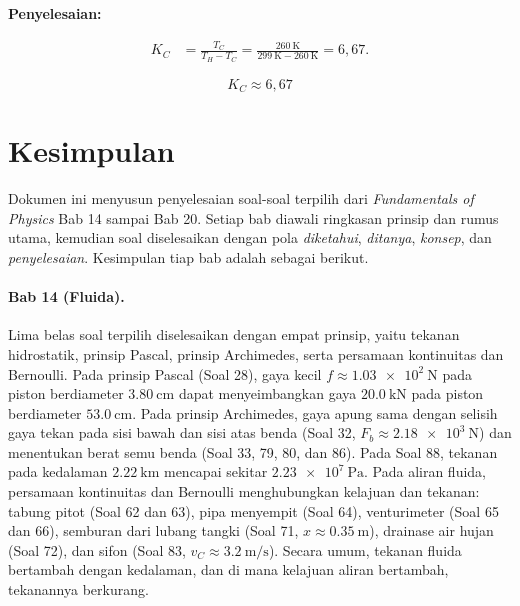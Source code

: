 \documentclass[12pt,a4paper]{article}
\newcommand{\penyelesaian}{\par\medskip\noindent\textbf{Penyelesaian:}\par\nopagebreak}
\begin{document}
\penyelesaian
\begin{align*}
K_C &= \frac{T_C}{T_H-T_C} = \frac{\SI{260}{\kelvin}}{\SI{299}{\kelvin}-\SI{260}{\kelvin}} = 6{,}67.
\end{align*}
\begin{jawaban}
\[
\boxed{K_C\approx 6{,}67}
\]
\end{jawaban}

\clearpage
{}
{}
\section*{Kesimpulan}

Dokumen ini menyusun penyelesaian soal-soal terpilih dari \textit{Fundamentals of Physics}
\cite{halliday} Bab 14 sampai Bab 20. Setiap bab diawali ringkasan prinsip dan rumus utama,
kemudian soal diselesaikan dengan pola \textit{diketahui}, \textit{ditanya}, \textit{konsep},
dan \textit{penyelesaian}. Kesimpulan tiap bab adalah sebagai berikut.

\paragraph{Bab 14 (Fluida).}
Lima belas soal terpilih diselesaikan dengan empat prinsip, yaitu tekanan hidrostatik,
prinsip Pascal, prinsip Archimedes, serta persamaan kontinuitas dan Bernoulli.
Pada prinsip Pascal (Soal 28), gaya kecil $f \approx \SI{1,03e2}{\newton}$ pada piston berdiameter
$\SI{3,80}{\centi\metre}$ dapat menyeimbangkan gaya $\SI{20,0}{\kilo\newton}$ pada piston berdiameter
$\SI{53,0}{\centi\metre}$. Pada prinsip Archimedes, gaya apung sama dengan selisih gaya tekan
pada sisi bawah dan sisi atas benda (Soal 32, $F_b \approx \SI{2,18e3}{\newton}$) dan menentukan
berat semu benda (Soal 33, 79, 80, dan 86). Pada Soal 88, tekanan pada kedalaman
$\SI{2,22}{\kilo\metre}$ mencapai sekitar $\SI{2,23e7}{\pascal}$. Pada aliran fluida, persamaan
kontinuitas dan Bernoulli menghubungkan kelajuan dan tekanan: tabung pitot (Soal 62 dan 63),
pipa menyempit (Soal 64), venturimeter (Soal 65 dan 66), semburan dari lubang tangki
(Soal 71, $x \approx \SI{0,35}{\metre}$), drainase air hujan (Soal 72), dan sifon (Soal 83,
$v_C \approx \SI{3,2}{\metre\per\second}$). Secara umum, tekanan fluida bertambah dengan kedalaman, dan
di mana kelajuan aliran bertambah, tekanannya berkurang.
\end{document}
